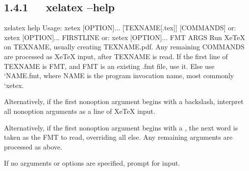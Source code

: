 \documentclass[letterpaper,12pt,english]{sphinxmanual}
\begin{document}
\subsection{1.4.1   xelatex –help}
\label{\detokenize{001software/001install/LaTex:xelatex-help}}
\begin{sphinxVerbatim}[commandchars=\\\{\}]
xelatex \PYGZhy{}\PYGZhy{}help
Usage: xetex [OPTION]... [TEXNAME[.tex]] [COMMANDS]
   or: xetex [OPTION]... \PYGZbs{}FIRST\PYGZhy{}LINE
   or: xetex [OPTION]... \PYGZam{}FMT ARGS
  Run XeTeX on TEXNAME, usually creating TEXNAME.pdf.
  Any remaining COMMANDS are processed as XeTeX input, after TEXNAME is read.
  If the first line of TEXNAME is \PYGZpc{}\PYGZam{}FMT, and FMT is an existing .fmt file,
  use it.  Else use `NAME.fmt\PYGZsq{}, where NAME is the program invocation name,
  most commonly `xetex\PYGZsq{}.

  Alternatively, if the first non\PYGZhy{}option argument begins with a backslash,
  interpret all non\PYGZhy{}option arguments as a line of XeTeX input.

  Alternatively, if the first non\PYGZhy{}option argument begins with a \PYGZam{}, the
  next word is taken as the FMT to read, overriding all else.  Any
  remaining arguments are processed as above.

  If no arguments or options are specified, prompt for input.


\end{sphinxVerbatim}
\end{document}
